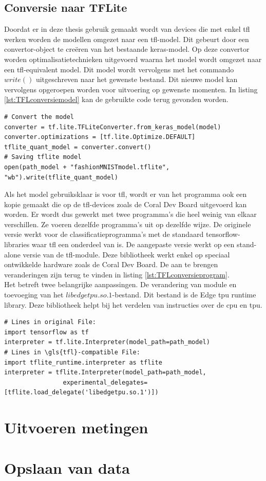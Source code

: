 	\subsection{Conversie naar TFLite} \label{prg:ConversieTFL}
		Doordat er in deze thesis gebruik gemaakt wordt van devices die met enkel \gls{tfl} werken worden de modellen omgezet naar een \gls{tfl}-model. Dit gebeurt door een convertor-object te cre\"eren van het bestaande keras-model. Op deze convertor worden optimalisatietechnieken uitgevoerd waarna het model wordt omgezet naar een \gls{tfl}-equivalent model. Dit model wordt vervolgens met het commando $write()$ uitgeschreven naar het gewenste bestand. Dit nieuwe model kan vervolgens opgeroepen worden voor uitvoering op gewenste momenten. In listing \ref{lst:TFLconversiemodel} kan de gebruikte code terug gevonden worden.
	\begin{lstlisting}[caption={Converteren naar een \gls{tfl}-model.}, captionpos=b,label={lst:TFLconversiemodel}]
# Convert the model
converter = tf.lite.TFLiteConverter.from_keras_model(model)
converter.optimizations = [tf.lite.Optimize.DEFAULT]
tflite_quant_model = converter.convert()
# Saving tflite model
open(path_model + "fashionMNISTmodel.tflite", "wb").write(tflite_quant_model)
\end{lstlisting}	
	
		Als het model gebruiksklaar is voor \gls{tfl}, wordt er van het programma ook een kopie gemaakt die op de \gls{tfl}-devices zoals de Coral Dev Board uitgevoerd kan worden. Er wordt dus gewerkt met twee programma's die heel weinig van elkaar verschillen. Ze voeren dezelfde programma's uit op dezelfde wijze. De originele versie werkt voor de classificatieprogramma's met de standaard tensorflow-libraries waar \gls{tfl} een onderdeel van is. De aangepaste versie werkt op een stand-alone versie van de \gls{tfl}-module. Deze bibliotheek werkt enkel op speciaal ontwikkelde hardware zoals de Coral Dev Board. De aan te brengen veranderingen zijn terug te vinden in listing \ref{lst:TFLconversieprogram}. \\
		
		Het betreft twee belangrijke aanpassingen. De verandering van module en toevoeging van het $libedgetpu.so.1$-bestand. Dit bestand is de Edge \gls{tpu} runtime library. Deze bibliotheek helpt bij het verdelen van instructies over de \gls{cpu} en \gls{tpu}. 

	\begin{lstlisting}[caption={Converteren naar een \gls{tfl}-programma.}, captionpos=b,label={lst:TFLconversieprogram}]
# Lines in original File:
import tensorflow as tf
interpreter = tf.lite.Interpreter(model_path=path_model)
# Lines in \gls{tfl}-compatible File:
import tflite_runtime.interpreter as tflite
interpreter = tflite.Interpreter(model_path=path_model,
				experimental_delegates=[tflite.load_delegate('libedgetpu.so.1')])
\end{lstlisting}	






		
\section{Uitvoeren metingen}


\section{Opslaan van data}
